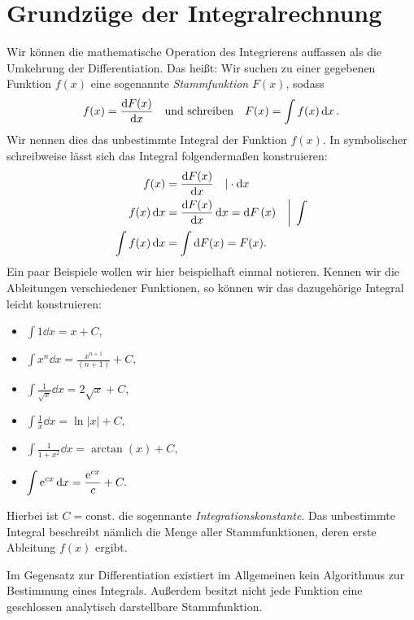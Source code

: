 \section{Grundzüge der Integralrechnung}

Wir können die mathematische Operation des Integrierens auffassen als die Umkehrung der Differentiation. Das heißt: Wir suchen zu einer gegebenen Funktion $f(x)$ eine sogenannte \emph{Stammfunktion} $F(x)$, sodass 
\begin{align}
    f(x) = \dv{F(x)}{x} \qq{und schreiben} F(x) = \int f(x) \dd{x}.
\end{align}
Wir nennen dies das unbestimmte Integral der Funktion $f(x)$. In symbolischer schreibweise lässt sich das Integral folgendermaßen konstruieren: 
\begin{align}
    f(x) &= \dv{F(x)}{x} \quad |\cdot \dd{x} \notag \\
    f(x) \dd{x} &= \dv{F(x)}{x}\dd{x} = \dd{F}(x) \quad \bigg|\; \int \notag \\
    \int f(x) \dd{x} &= \int \dd{F(x)} = F(x).    
\end{align}
Ein paar Beispiele wollen wir hier beispielhaft einmal notieren. Kennen wir die Ableitungen verschiedener Funktionen, so können wir das dazugehörige Integral leicht konstruieren: 
\begin{multicols}{2}
    \begin{itemize}
        \item $\displaystyle \int 1 \dd{x} = x + C,$
        \item $\displaystyle \int x^n \dd{x} = \frac{x^{n+1}}{(n+1)} + C,$
        \item $\displaystyle \int \frac{1}{\sqrt{x}} \dd{x} = 2\sqrt{x} + C,$
        \item $\displaystyle \int \frac{1}{x} \dd{x} = \ln|x| + C,$
        \item $\displaystyle \int \frac{1}{1+x^2} \dd{x} = \arctan(x) + C,$
        \item $\displaystyle \int \mathrm{e}^{cx} \dd{x} = \frac{\mathrm{e}^{cx}}{c} + C.$
    \end{itemize}
\end{multicols}
Hierbei ist $C = \text{const.}$ die sogennante \emph{Integrationskonstante}. Das unbestimmte Integral beschreibt nämlich die Menge aller Stammfunktionen, deren erste Ableitung $f(x)$ ergibt. 

Im Gegensatz zur Differentiation existiert im Allgemeinen kein Algorithmus zur Bestimmung eines Integrals. Außerdem besitzt nicht jede Funktion eine geschlossen analytisch darstellbare Stammfunktion.

